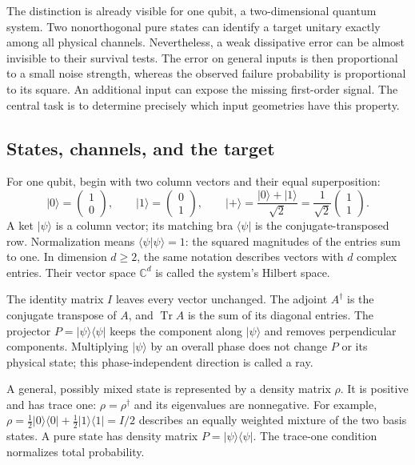 \documentclass[11pt,a4paper]{article}
\newcommand{\ket}[1]{\lvert #1\rangle}
\newcommand{\bra}[1]{\langle #1\rvert}
\newcommand{\Tr}{\operatorname{Tr}}
\numberwithin{equation}{section}
\begin{document}
The distinction is already visible for one qubit, a two-dimensional quantum system. Two nonorthogonal pure states can identify a target unitary exactly among all physical channels. Nevertheless, a weak dissipative error can be almost invisible to their survival tests. The error on general inputs is then proportional to a small noise strength, whereas the observed failure probability is proportional to its square. An additional input can expose the missing first-order signal. The central task is to determine precisely which input geometries have this property.

\subsection{States, channels, and the target}

For one qubit, begin with two column vectors and their equal superposition:
\[
 \ket0=\begin{pmatrix}1\\0\end{pmatrix},\qquad
 \ket1=\begin{pmatrix}0\\1\end{pmatrix},\qquad
 \ket+=\frac{\ket0+\ket1}{\sqrt2}
       =\frac1{\sqrt2}\begin{pmatrix}1\\1\end{pmatrix}.
\]
A ket $\ket\psi$ is a column vector; its matching bra $\bra\psi$ is the
conjugate-transposed row. Normalization means $\bra\psi\psi\rangle=1$:
the squared magnitudes of the entries sum to one. In dimension $d\ge2$,
the same notation describes vectors with $d$ complex entries. Their vector
space $\mathbb C^d$ is called the system's Hilbert space.

The identity matrix $I$ leaves every vector unchanged. The adjoint
$A^\dagger$ is the conjugate transpose of $A$, and $\Tr A$ is the sum of
its diagonal entries. The projector $P=\ket\psi\bra\psi$ keeps the component
along $\ket\psi$ and removes perpendicular components. Multiplying
$\ket\psi$ by an overall phase does not change $P$ or its physical state;
this phase-independent direction is called a ray.

A general, possibly mixed state is represented by a density matrix $\rho$.
It is positive and has trace one: $\rho=\rho^\dagger$ and its eigenvalues
are nonnegative. For example,
$\rho=\tfrac12\ket0\bra0+\tfrac12\ket1\bra1=I/2$ describes an equally
weighted mixture of the two basis states. A pure state has density matrix
$P=\ket\psi\bra\psi$. The trace-one condition normalizes total probability.
\end{document}
